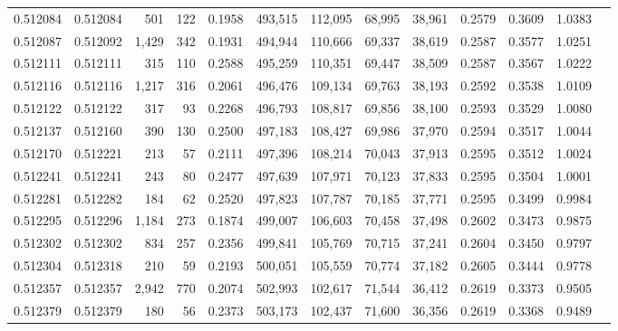 \begin{tabular}{rrrrrrrrrrrrr}
0.512084 & 0.512084 &   501 &   122 &                                     0.1958 & 493,515 & 112,095 &  68,995 &  38,961 & 0.2579 & 0.3609 & 1.0383 \\
0.512087 & 0.512092 & 1,429 &   342 &                                     0.1931 & 494,944 & 110,666 &  69,337 &  38,619 & 0.2587 & 0.3577 & 1.0251 \\
0.512111 & 0.512111 &   315 &   110 &                                     0.2588 & 495,259 & 110,351 &  69,447 &  38,509 & 0.2587 & 0.3567 & 1.0222 \\
0.512116 & 0.512116 & 1,217 &   316 &                                     0.2061 & 496,476 & 109,134 &  69,763 &  38,193 & 0.2592 & 0.3538 & 1.0109 \\
0.512122 & 0.512122 &   317 &    93 &                                     0.2268 & 496,793 & 108,817 &  69,856 &  38,100 & 0.2593 & 0.3529 & 1.0080 \\
0.512137 & 0.512160 &   390 &   130 &                                     0.2500 & 497,183 & 108,427 &  69,986 &  37,970 & 0.2594 & 0.3517 & 1.0044 \\
0.512170 & 0.512221 &   213 &    57 &                                     0.2111 & 497,396 & 108,214 &  70,043 &  37,913 & 0.2595 & 0.3512 & 1.0024 \\
0.512241 & 0.512241 &   243 &    80 &                                     0.2477 & 497,639 & 107,971 &  70,123 &  37,833 & 0.2595 & 0.3504 & 1.0001 \\
0.512281 & 0.512282 &   184 &    62 &                                     0.2520 & 497,823 & 107,787 &  70,185 &  37,771 & 0.2595 & 0.3499 & 0.9984 \\
0.512295 & 0.512296 & 1,184 &   273 &                                     0.1874 & 499,007 & 106,603 &  70,458 &  37,498 & 0.2602 & 0.3473 & 0.9875 \\
0.512302 & 0.512302 &   834 &   257 &                                     0.2356 & 499,841 & 105,769 &  70,715 &  37,241 & 0.2604 & 0.3450 & 0.9797 \\
0.512304 & 0.512318 &   210 &    59 &                                     0.2193 & 500,051 & 105,559 &  70,774 &  37,182 & 0.2605 & 0.3444 & 0.9778 \\
0.512357 & 0.512357 & 2,942 &   770 &                                     0.2074 & 502,993 & 102,617 &  71,544 &  36,412 & 0.2619 & 0.3373 & 0.9505 \\
0.512379 & 0.512379 &   180 &    56 &                                     0.2373 & 503,173 & 102,437 &  71,600 &  36,356 & 0.2619 & 0.3368 & 0.9489 \\

\end{tabular}
